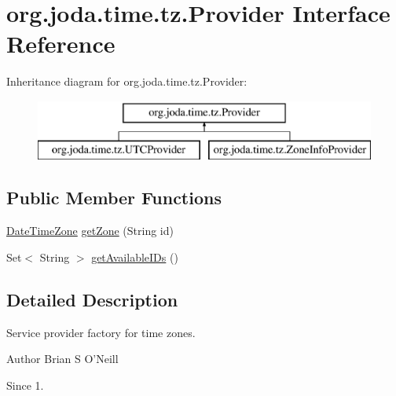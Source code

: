 \hypertarget{interfaceorg_1_1joda_1_1time_1_1tz_1_1_provider}{\section{org.\-joda.\-time.\-tz.\-Provider Interface Reference}
\label{interfaceorg_1_1joda_1_1time_1_1tz_1_1_provider}
}
Inheritance diagram for org.\-joda.\-time.\-tz.\-Provider\-:\begin{figure}[H]
\begin{center}
\leavevmode
\includegraphics[height=2.000000cm]{interfaceorg_1_1joda_1_1time_1_1tz_1_1_provider}
\end{center}
\end{figure}
\subsection*{Public Member Functions}
\begin{DoxyCompactItemize}
\item 
\hyperlink{classorg_1_1joda_1_1time_1_1_date_time_zone}{Date\-Time\-Zone} \hyperlink{interfaceorg_1_1joda_1_1time_1_1tz_1_1_provider_aab5de22558faab2c6d8234081ffeb56b}{get\-Zone} (String id)
\item 
Set$<$ String $>$ \hyperlink{interfaceorg_1_1joda_1_1time_1_1tz_1_1_provider_a6f87e208046069a6ee2896edc841e552}{get\-Available\-I\-Ds} ()
\end{DoxyCompactItemize}


\subsection{Detailed Description}
Service provider factory for time zones.

\begin{DoxyAuthor}{Author}
Brian S O'Neill 
\end{DoxyAuthor}
\begin{DoxySince}{Since}
1. 
\end{DoxySince}


